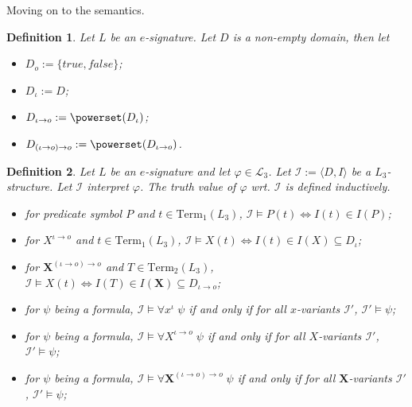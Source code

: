 \documentclass[11pt,a4paper]{article}
\newtheorem{mydef}{Definition}
\newcommand{\of}{\iota }
\newcommand{\os}{\iota \to o}
\newcommand{\ot}{(\iota \to o)\to o}
\begin{document}
Moving on to the semantics.

\begin{mydef}
Let $L$ be an $e$-signature. Let  $D$ is a non-empty domain, then let
\begin{itemize}
\item $D_{o}:=\{\mathit{true}, \mathit{false}\}$;
\item $D_{\of}:=D$;
\item $D_{\os }:=\powerset(D_{\of})$;
\item $D_{\ot}:=\powerset(D_{\os})$.
\end{itemize}
\end{mydef} 


\begin{mydef}
Let $L$ be an $e$-signature and let $\varphi \in \mathcal{L}_3$. Let $\mathcal{I}:=\langle D,I \rangle$ be a $L_3$-structure. Let $\mathcal{I}$ interpret $\varphi$. The truth value of $\varphi$ wrt. $\mathcal{I}$ is defined inductively.
\begin{itemize}
\item for predicate symbol $P$ and $t\in \mathrm{Term}_1(L_3)$, $\mathcal{I} \models P(t) \iff I(t) \in I(P)$;
\item for $X^{\os}$ and $t\in \mathrm{Term}_{1}(L_3)$, $\mathcal{I} \models X(t) \iff I(t) \in I(X) \subseteq D_{\of}$;
\item for $\mathbf{X}^{\ot}$ and $T\in \mathrm{Term}_{2}(L_3)$, $\mathcal{I} \models X(t) \iff I(T) \in I(\mathbf{X}) \subseteq D_{\os}$;
\item for $\psi$ being a formula, $\mathcal{I} \models \forall x^{\of} \; \psi$  if and only if for all $x$-variants $\mathcal{I}'$, $\mathcal{I}' \models \psi$;
\item for $\psi$ being a formula, $\mathcal{I} \models \forall X^{\os} \; \psi$  if and only if for all $X$-variants $\mathcal{I}'$, $\mathcal{I}' \models \psi$;
\item for $\psi$ being a formula, $\mathcal{I} \models \forall \mathbf{X}^{\ot} \; \psi$  if and only if for all $\mathbf{X}$-variants $\mathcal{I}'$, $\mathcal{I}' \models \psi$;

\end{itemize}
\end{mydef}
\end{document}
